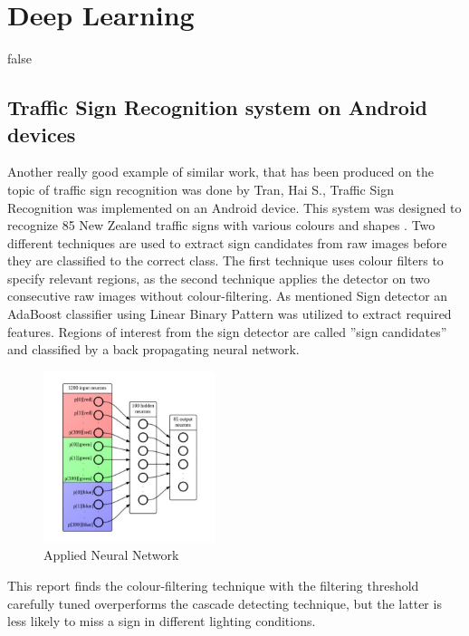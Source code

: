 \section{Deep Learning}\label{ssec:koreancnn}
\if false

\subsection{Traffic Sign Recognition system on Android devices}
Another really good example of similar work, that has been produced on the topic of traffic sign recognition was done by Tran, Hai S., Traffic Sign Recognition was implemented on an Android device. This system was designed to recognize 85 New Zealand traffic signs with various colours and shapes \cite{androidnn}. \newline
Two different techniques are used to extract sign candidates from raw images before they are classified to the correct class. The first technique uses colour filters to specify relevant regions, as the
second technique applies the detector on two consecutive raw images without colour-filtering. As mentioned Sign detector an AdaBoost classifier using Linear Binary Pattern was utilized to extract required features. Regions of interest from the sign detector are called ”sign candidates” and classified by a back propagating neural network. 

\begin{figure}[H]
	\centering
	\includegraphics[height=5cm]{images/tranNN.jpg}
	\caption{Applied Neural Network}
	\label{fig:tranNN}
\end{figure}




This report
finds the colour-filtering technique with the filtering threshold carefully tuned
overperforms the cascade detecting technique, but the latter is less likely to
miss a sign in different lighting conditions.

\fi

